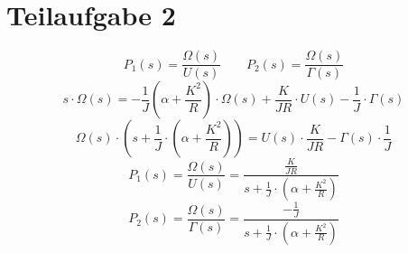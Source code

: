 \section{Teilaufgabe 2}
\[ P_1(s) = \frac{\Omega(s)}{U(s)} \qquad P_2(s) = \frac{\Omega(s)}{\Gamma(s)} \]
\[ s \cdot \Omega(s) 
    = -\frac{1}{J} \left(\alpha + \frac{K^2}{R}\right) \cdot \Omega(s)
    + \frac{K}{JR} \cdot U(s) 
    - \frac{1}{J} \cdot \Gamma(s)
\]
\[ \Omega(s) \cdot \left(s + \frac{1}{J} \cdot \left(\alpha + \frac{K^2}{R}\right)\right) 
    = U(s) \cdot \frac{K}{JR} 
    - \Gamma(s) \cdot \frac{1}{J}
\]
\[ P_1(s) = \frac{\Omega(s)}{U(s)} 
    = \frac{\frac{K}{JR}}{s + \frac{1}{J} \cdot \left(\alpha + \frac{K^2}{R}\right)}
\]
\[ P_2(s) = \frac{\Omega(s)}{\Gamma(s)}
    = \frac{-\frac{1}{J}}{s + \frac{1}{J} \cdot \left(\alpha + \frac{K^2}{R}\right)}
\]

